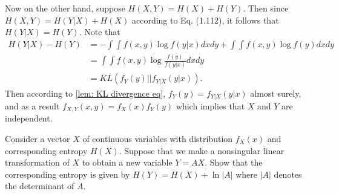 Now on the other hand, suppose $H(X,Y)=H(X)+H(Y).$ Then since $H(X,Y)=H(Y\vert X)+H(X)$
according to Eq. (1.112), it follows that $H(Y\vert X)=H(Y).$ Note
that 
\begin{align*}
H(Y\vert X)-H(Y) & =-\int\int f(x,y)\log f(y\vert x)dxdy+\int\int f(x,y)\log f(y)dxdy\\
 & =\int\int f(x,y)\log\frac{f(y)}{f(y\vert x)}dxdy\\
 & =KL(f_{Y}(y)||f_{Y\vert X}(y\vert x)).
\end{align*}
Then according to \ref{lem: KL divergence eq}, $f_{Y}(y)=f_{Y\vert X}(y\vert x)$
almost surely, and as a result $f_{X,Y}(x,y)=f_{X}(x)f_{Y}(y)$ which
implies that $X$ and $Y$ are independent. \\

\begin{cBoxA}{}
 Consider a vector $X$ of continuous variables with distribution
$f_{X}(x)$ and corresponding entropy $H(X)$. Suppose that we make
a nonsingular linear transformation of $X$ to obtain a new variable
$Y=AX$. Show that the corresponding entropy is given by $H(Y)=H(X)+\ln\left|A\right|$
where $\left|A\right|$ denotes the determinant of $A$.
\end{cBoxA}

